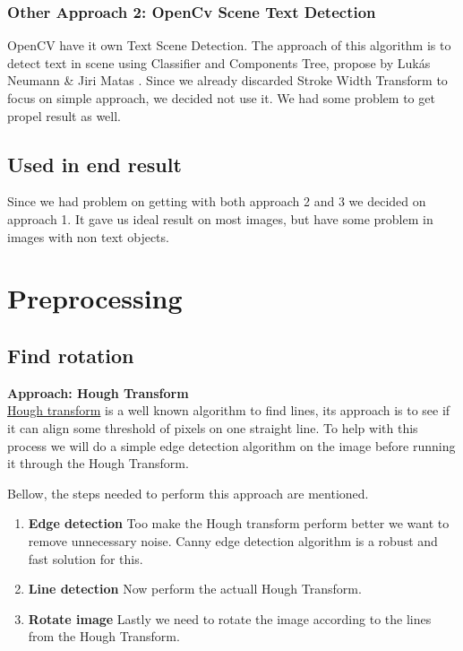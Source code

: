 \documentclass[Report.tex]{subfiles}
\begin{document}
\begin{flushleft}
  \subsubsection{Other Approach 2: OpenCv Scene Text Detection}
  OpenCV have it own Text Scene Detection. The approach of this algorithm is to detect text in scene using Classifier and Components Tree, propose by Lukás Neumann \& Jiri Matas \cite{neumann_real-time_2012}. Since we already discarded Stroke Width Transform to focus on simple approach, we decided not use it. We had some problem to get propel result as well.
\end{flushleft}

\subsection{Used in end result}
Since we had problem on getting with both approach 2 and 3 we decided on approach 1. It gave us ideal result on most images, but have some problem in images with non text objects.

\section{Preprocessing}
\subsection{Find rotation}

\begin{flushleft}
  \textbf{Approach: Hough Transform} \\
  \href{https://en.wikipedia.org/wiki/Hough_transform}{Hough transform} is a
  well known algorithm to find lines, its approach is to see if it can
  align some threshold of pixels on one straight line. To help with this
  process we will do a simple edge detection algorithm on the image before
  running it through the Hough Transform. \par
  Bellow, the steps needed to perform this approach are mentioned.

  \begin{enumerate}
    \item \textbf{Edge detection}
    Too make the Hough transform perform better we want to remove unnecessary
    noise. Canny edge detection algorithm is a robust and fast solution for
    this.
    \item \textbf{Line detection}
    Now perform the actuall Hough Transform.
    \item \textbf{Rotate image}
    Lastly we need to rotate the image according to the lines from the Hough
    Transform.
  \end{enumerate}
\end{flushleft}
\end{document}
